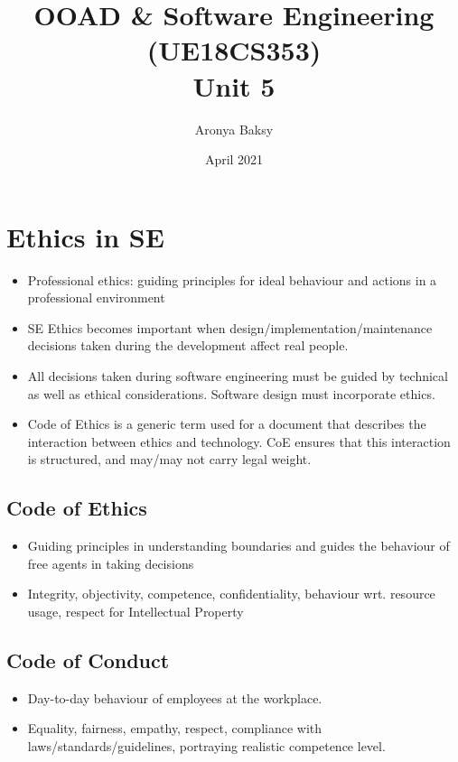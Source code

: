 \documentclass{article}
\title{OOAD \& Software Engineering (UE18CS353) \\
    Unit 5}
\author{Aronya Baksy}
\date{April 2021}
\begin{document}
\maketitle
\section{Ethics in SE}
\begin{itemize}
    \item Professional ethics: guiding principles for ideal behaviour and actions in a professional environment
    
    \item SE Ethics becomes important when design/implementation/maintenance decisions taken during the development affect real people. 
    
    \item All decisions taken during software engineering must be guided by technical as well as ethical considerations. Software design must incorporate ethics.
    
    \item Code of Ethics is a generic term used for a document that describes the interaction between ethics and technology. CoE ensures that this interaction is structured, and may/may not carry legal weight.
\end{itemize}
\subsection{Code of Ethics}
\begin{itemize}
    \item Guiding principles in understanding boundaries and guides the behaviour of  free agents in taking decisions
    
    \item Integrity, objectivity, competence, confidentiality, behaviour wrt. resource usage, respect for Intellectual Property
\end{itemize}

\subsection{Code of Conduct}
\begin{itemize}
    \item Day-to-day behaviour of employees at the workplace. 
    
    \item Equality, fairness, empathy, respect, compliance with laws/standards/guidelines, portraying realistic competence level. 
\end{itemize}
\end{document}
